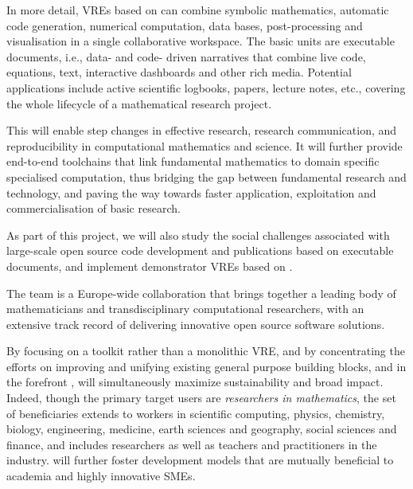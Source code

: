 In more detail, VREs based on \TheProject can combine symbolic
mathematics, automatic code generation, numerical computation, data
bases, post-processing and visualisation in a single collaborative
workspace. The basic units are executable documents, i.e., data- and
code- driven narratives that combine live code, equations, text,
interactive dashboards and other rich media. Potential applications
include active scientific logbooks, papers, lecture notes, etc.,
covering the whole lifecycle of a mathematical research project.

This will enable step changes in effective research, research
communication, and reproducibility in computational mathematics and
science. It will further provide end-to-end toolchains that link
fundamental mathematics to domain specific specialised computation,
thus bridging the gap between fundamental research and technology, and
paving the way towards faster application, exploitation and
commercialisation of basic research.

As part of this project, we will also study the social challenges
associated with large-scale open source code development and
publications based on executable documents, and implement
demonstrator VREs based on \TheProject.

The \TheProject team is a Europe-wide collaboration that brings
together a leading body of mathematicians and transdisciplinary
computational researchers, with an extensive track record of
delivering innovative open source software solutions.

By focusing on a toolkit rather than a monolithic VRE, and by
concentrating the efforts on improving and unifying existing general
purpose building blocks, and in the forefront \Jupyter, \TheProject
will simultaneously maximize sustainability and broad impact. Indeed,
though the primary target users are \emph{researchers in
  mathematics}, the set of beneficiaries extends to workers in scientific
computing, physics, chemistry, biology, engineering, medicine, earth
sciences and geography, social sciences and finance, and includes researchers as well as teachers
and practitioners in the industry. \TheProject will further foster
development models that are mutually beneficial to academia and highly
innovative SMEs.






\clearpage


